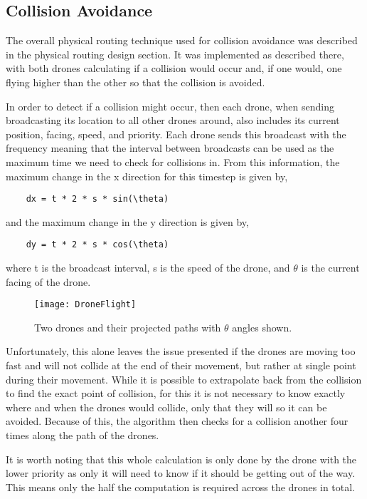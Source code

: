 \subsection{Collision Avoidance}
\label{sec:physicalrouting_collsionavoidance}

The overall physical routing technique used for collision avoidance was described in the physical routing design section. It was implemented as described there, with both drones calculating if a collision would occur and, if one would, one flying higher than the other so that the collision is avoided.

In order to detect if a collision might occur, then each drone, when sending broadcasting its location to all other drones around, also includes its current position, facing, speed, and priority. Each drone sends this broadcast with the frequency meaning that the interval between broadcasts can be used as the maximum time we need to check for collisions in. From this information, the maximum change in the x direction for this timestep is given by,
\begin{verbatim}
	dx = t * 2 * s * sin(\theta)
\end{verbatim}
and the maximum change in the y direction is given by,
\begin{verbatim}
	dy = t * 2 * s * cos(\theta)
\end{verbatim}
where t is the broadcast interval, s is the speed of the drone, and $\theta$ is the current facing of the drone.

\begin{figure}
\centering
\texttt{[image: DroneFlight]}
\caption{Two drones and their projected paths with $\theta$ angles shown.}
\label{fig:drone_flight}
\end{figure}

Unfortunately, this alone leaves the issue presented if the drones are moving too fast and will not collide at the end of their movement, but rather at single point during their movement. While it is possible to extrapolate back from the collision to find the exact point of collision, for this it is not necessary to know exactly where and when the drones would collide, only that they will so it can be avoided. Because of this, the algorithm then checks for a collision another four times along the path of the drones.

It is worth noting that this whole calculation is only done by the drone with the lower priority as only it will need to know if it should be getting out of the way. This means only the half the computation is required across the drones in total.